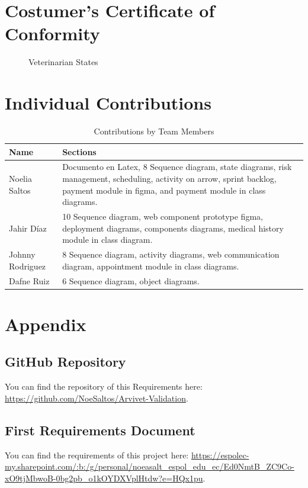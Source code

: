 \documentclass[a4paper,12pt]{report}
\begin{document}
	
	\chapter{Costumer's Certificate of Conformity}
	
	\begin{figure}[h!]
		\centering

		\caption{Veterinarian States}
		\label{fig:Acceptance Certificate}
	\end{figure}
	\clearpage
	
	\chapter{Individual Contributions}
	
	\begin{table}[h!]
		\centering
		\begin{tabular}{|m{4cm}|m{10cm}|}
			\hline
			\textbf{Name} & \textbf{Sections} \\ \hline
			Noelia Saltos & Documento en Latex, 8 Sequence diagram, state diagrams, risk management, scheduling, activity on arrow, sprint backlog, payment module in figma, and payment module in class diagrams. \\ \hline
			Jahir Díaz & 10 Sequence diagram, web component prototype figma, deployment diagrams, components diagrams, medical history module in class diagram. \\ \hline
			Johnny Rodriguez & 8 Sequence diagram, activity diagrams, web communication diagram, appointment module in class diagrams. \\ \hline
			Dafne Ruiz & 6 Sequence diagram, object diagrams. \\ \hline
		\end{tabular}
		\caption{Contributions by Team Members}
	\end{table}
	
	\chapter{Appendix}
	
	\section{ GitHub Repository}
	You can find the repository of this Requirements here: \url{https://github.com/NoeSaltos/Arvivet-Validation}.
	
	\section{First Requirements Document}
	You can find the requirements of this project here: \url{https://espolec-my.sharepoint.com/:b:/g/personal/noeasalt_espol_edu_ec/Ed0NmtB_ZC9Co-xO9tjMbwoB-0bg2pb_o1kOYDXVplHtdw?e=HQx1pu}.
	
\end{document}
